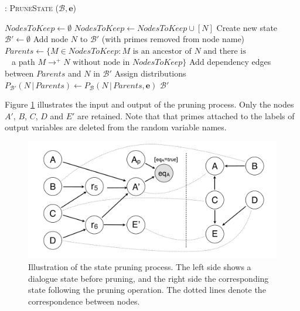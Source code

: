 \begin{algorithm}[h]
\caption{: \textsc{PruneState} ($\mathcal{B}, \mathbf{e}$)}
\begin{algorithmic}[1] \vspace{1mm}
\STATE $\mathit{NodesToKeep} \leftarrow \emptyset$
\STATE $\mathit{NodesToKeep} \leftarrow \mathit{NodesToKeep} \cup [N]$ 
\ENDIF
\ENDFOR
\STATE Create new state $\mathcal{B'} \leftarrow \emptyset$
\STATE Add node $N$ to $\mathcal{B'}$ (with primes removed from node name)
\STATE $\mathit{Parents} \leftarrow \{M \in \mathit{NodesToKeep} : M \text{ is an ancestor of } N \text{ and there is } $ \\ $\phantom{a}$  \; \; \; \; \; \; \; \; \;  a path $M \rightarrow^+  N \text{ without node in } \mathit{NodesToKeep} \}$ 
\STATE Add dependency edges between $\mathit{Parents}$ and $N$ in $\mathcal{B}'$
\STATE Assign distributions $P_{\mathcal{B}'}(N \, | \, \mathit{Parents}) \leftarrow P_{\mathcal{B}}(N \, | \, \mathit{Parents}, \mathbf{e})$
\ENDFOR
\RETURN $\mathcal{B}'$
\end{algorithmic}
\label{algo:pruneState}
\end{algorithm}


Figure \ref{fig:pruning} illustrates the input and output of the pruning process.  Only the nodes $A'$, $B$, $C$, $D$ and $E'$ are retained. Note that that primes attached to the labels of output variables are deleted from the random variable names.

\begin{figure}[h]
\centering
\includegraphics[scale=0.20]{imgs/pruning.pdf}
\caption{Illustration of the state pruning process. The left side shows a dialogue state before pruning, and the right side the corresponding state following the pruning operation. The dotted lines denote the correspondence between nodes.}
\label{fig:pruning}
\end{figure}


